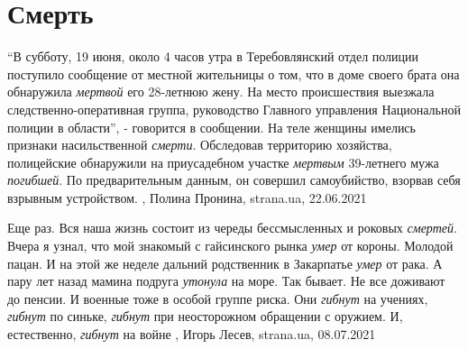  
 
 
 
 
\chapter{Смерть}
\label{sec:slova.smert}

\enquote{В субботу, 19 июня, около 4 часов утра в Теребовлянский отдел полиции
поступило сообщение от местной жительницы о том, что в доме своего брата она
обнаружила \emph{мертвой} его 28-летнюю жену. На место происшествия выезжала
следственно-оперативная группа, руководство Главного управления Национальной
полиции в области}, - говорится в сообщении.  На теле женщины имелись признаки
насильственной \emph{смерти}. Обследовав территорию хозяйства, полицейские обнаружили
на приусадебном участке \emph{мертвым} 39-летнего мужа \emph{погибшей}. По предварительным
данным, он совершил самоубийство, взорвав себя взрывным устройством.
  , Полина Пронина, strana.ua, 22.06.2021

Еще раз. Вся наша жизнь состоит из череды бессмысленных и роковых \emph{смертей}.
Вчера я узнал, что мой знакомый с гайсинского рынка \emph{умер} от короны. Молодой
пацан. И на этой же неделе дальний родственник в Закарпатье \emph{умер} от рака. А
пару лет назад мамина подруга \emph{утонула} на море. Так бывает. Не все доживают до
пенсии.  И военные тоже в особой группе риска. Они \emph{гибнут} на учениях, \emph{гибнут} по
синьке, \emph{гибнут} при неосторожном обращении с оружием. И, естественно, \emph{гибнут} на
войне
, 
Игорь Лесев, strana.ua, 08.07.2021
